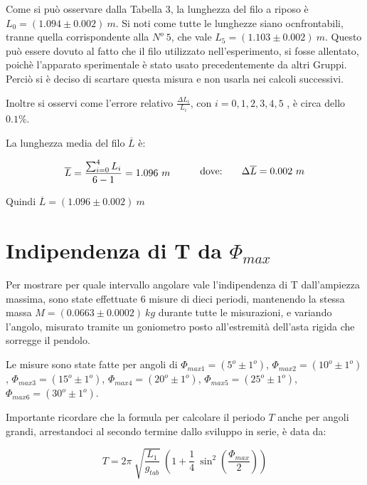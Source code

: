 \documentclass[12pt, a4paper]{article}
\begin{document}
Come si può osservare dalla Tabella 3, la lunghezza del filo a riposo è $L_0=(1.094\pm0.002)\ m$. Si noti come tutte le lunghezze siano ocnfrontabili, tranne quella corrispondente alla $N^o\ 5$, che vale $L_5=(1.103\pm0.002)\ m$. Questo può essere dovuto al fatto che il filo utilizzato nell'esperimento, si fosse allentato, poichè l'apparato sperimentale è stato usato precedentemente da altri Gruppi. 
Perciò si è deciso di scartare questa misura e non usarla nei calcoli successivi. 

Inoltre si osservi come l'errore relativo $\displaystyle \frac{\Delta L_i}{L_i}$, con $i={0,1,2,3,4,5}$ , è circa dello $0.1\%$.

La lunghezza media del filo $\overline{L}$ è:

\begin{equation*}
\begin{aligned}
  & & \overline{L}=\frac{\sum_{i=0}^{4}L_i}{6-1}=1.096\ m
  &\quad{} 
  \end{aligned}
  \begin{aligned}
  & &\text{dove:\phantom{.......}} \Delta \overline{L}=0.002\ m
  &
  \end{aligned}
\end{equation*}
\bigskip

Quindi $\overline{L}=(1.096\pm0.002)\ m$


\section{Indipendenza di T da $\Phi_{max}$}
\label{Indip T da angolo}

Per mostrare per quale intervallo angolare vale l'indipendenza di T dall'ampiezza massima, sono state effettuate 6 misure di dieci periodi, mantenendo la stessa massa $M=(0.0663\pm0.0002)\ kg$ durante tutte le misurazioni, e variando l'angolo, misurato tramite un goniometro posto all'estremità dell'asta rigida che sorregge il pendolo. 
\bigskip

Le misure sono state fatte per angoli di $\Phi_{max1}=(5^o\pm1^o)$, $\Phi_{max2}=(10^o\pm1^o)$, $\Phi_{max3}=(15^o\pm1^o)$, $\Phi_{max4}=(20^o\pm1^o)$, $\Phi_{max5}=(25^o\pm1^o)$, $\Phi_{max6}=(30^o\pm1^o)$.

Importante ricordare che la formula per calcolare il periodo $T$ anche per angoli grandi, arrestandoci al secondo termine dallo sviluppo in serie, è data da:

\begin{equation*}
    T=2\pi\ \sqrt{\frac{L_1}{g_{tab}}}\ \left(1+\frac{1}{4}\ \sin^2{\left(\frac{\Phi_{max}}{2}\right)}\right)
\end{equation*}
\end{document}
